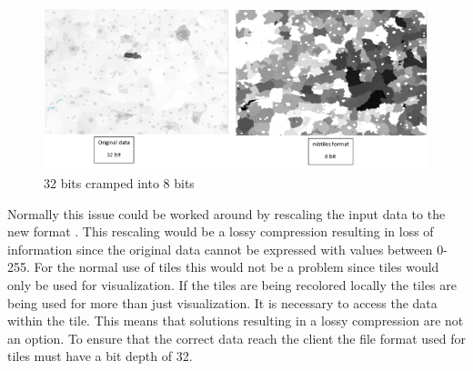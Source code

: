 \begin{figure} [H]
	\centering
	\includegraphics[width=.6\textwidth]{Pictures/WhyNot8Bit}
	\caption{32 bits cramped into 8 bits}
	\label{WhyNot8Bit}
\end{figure}

Normally this issue could be worked around by rescaling the input data to the new format \citep{gdal2tilesDoc} . This rescaling would be a lossy compression resulting in loss of information since the original data cannot be expressed with values between 0-255. \citep{Dent}
For the normal use of tiles this would not be a problem since tiles would only be used for visualization. 
If the tiles are being recolored locally the tiles are being used for more than just visualization. It is necessary to access the data within the tile. This means that solutions resulting in a lossy compression are not an option. To ensure that the correct data reach the client the file format used for tiles must have a bit depth of 32.